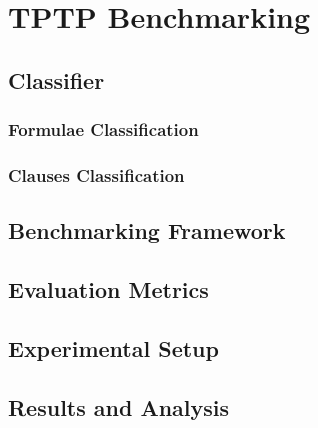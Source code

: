 \chapter{TPTP Benchmarking}\label{chap:tptp-benchmarking}
\section{Classifier}\label{sec:classifier}
\subsection{Formulae Classification}\label{subsec:formulae-classification}
\subsection{Clauses Classification}\label{subsec:clauses-classification}
\section{Benchmarking Framework}\label{sec:tptp-benchmarking-framework}
\section{Evaluation Metrics}\label{sec:tptp-evaluation-metrics}
\section{Experimental Setup}\label{sec:tptp-experimental-setup}
\section{Results and Analysis}\label{sec:tptp-results-analysis}


